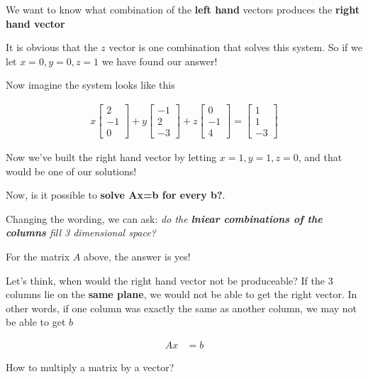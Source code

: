 \documentclass[12pt]{article}
\begin{document}
We want to know what combination of the \textbf{left hand} vectors produces the \textbf{right hand vector}


It is obvious that the $ z $ vector is one combination that solves this system. So if we let $ x=0, y=0, z=1 $ we have found our answer!

Now imagine the system looks like this

\begin{align*}
    x \begin{bmatrix}
    2\\
    -1\\
    0
    \end{bmatrix}
    +
    y \begin{bmatrix}
    -1\\
    2\\
    -3
    \end{bmatrix}
    + z \begin{bmatrix}
    0\\
    -1\\
    4
    \end{bmatrix}
    = \begin{bmatrix}
    1\\
    1\\
    -3
    \end{bmatrix}
\end{align*}

Now we've built the right hand vector by letting $ x=1, y=1, z=0 $, and that would be one of our solutions!

Now, is it possible to \textbf{solve Ax=b for every b?}.

Changing the wording, we can ask: \emph{do the \textbf{lniear combinations of the columns} fill 3 dimensional space?}

For the matrix $ A $ above, the answer is yes! 

Let's think, when would the right hand vector not be produceable? If the 3 columns lie on the \textbf{same plane}, we would not be able to get the right vector. In other words, if one column was exactly the same as another column, we may not be able to get $ b $

\begin{align*}
    Ax &= b
\end{align*}

How to multiply a matrix by a vector?
\end{document}
